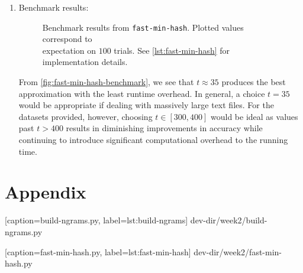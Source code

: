 \documentclass{article}
\begin{document}
\begin{enumerate}[leftmargin={*}, font={\bf}, label={\arabic*.}, ref={\arabic*}]
\begin{enumerate}[label={(\Alph*)}, ref={\theenumi(\Alph*)}]
      \item \label{qst:2B}
        Benchmark results:
        \begin{figure}[H]
          \centering
          \caption{
            Benchmark results from {\tt fast-min-hash}. Plotted values correspond to \\
            expectation on $100$ trials. See \autoref{lst:fast-min-hash} for implementation
            details.
          }
          \label{fig:fast-min-hash-benchmark}
        \end{figure}

        From \autoref{fig:fast-min-hash-benchmark}, we see that $t \approx 35$ produces the
        best approximation with the least runtime overhead. In general, a choice $t = 35$
        would be appropriate if dealing with massively large text files. For the datasets
        provided, however, choosing $t \in [300, 400]$ would be ideal as values past $t >
        400$ results in diminishing improvements in accuracy while continuing to introduce
        significant computational overhead to the running time.
    \end{enumerate}
\end{enumerate}

\newpage

\section*{Appendix}


  [caption={\sf build-ngrams.py}, label={lst:build-ngrams}]
  {dev-dir/week2/build-ngrams.py}


  [caption={\sf fast-min-hash.py}, label={lst:fast-min-hash}]
  {dev-dir/week2/fast-min-hash.py}
\end{document}
